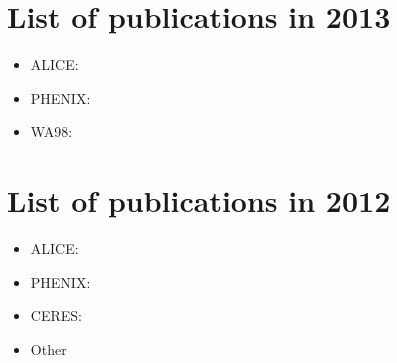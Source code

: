 \documentclass[12pt]{article}
\begin{document}
\section{List of publications in 2013}

\begin{itemize}
\item ALICE:
\cite{
Abelev:2012sq,
ALICE:2012xs,
Abelev:2012sea,
Abelev:2012sca,
Abelev:2012pv,
Abelev:2012pa,
Abelev:2012di,
Abelev:2013xaa,
ABELEV:2013wsa,
Abelev:2013sqa,
Abelev:2013bla,
Abelev:2013ala,
Abelev:2013cva,
Abbas:2013taa,
Abelev:2013lca,
Abbas:2013rua,
Abbas:2013oua,
Abbas:2013bpa,
ALICE:2013xna,
Abelev:2013vea,
Abelev:2013qoq,
Abelev:2013csa,
Abelev:2013fn,
Abelev:2012ola,
ALICE:2012mj,
Abelev:2012ba,
Abelev:2012hxa}

\item PHENIX:
\cite{
Adare:2012bv,
Adare:2012vv,
Adare:2013wop,
Adare:2013ezl,
Adare:2013esx,
Adare:2013piz,
Adare:2012qi,
Adare:2012vw,
Adare:2012wg,
Adare:2012qf}


\item WA98:
\cite{Aggarwal:2011ns}

\end{itemize}

\section{List of publications in 2012}

\begin{itemize}
\item ALICE:
\cite{
Abelev:2012ej,
ALICE:2011ac,
ALICE:2011aa,
Abelev:2011md,
Aamodt:2011vg,
Abelev:2012hy,
Abelev:2012wca,
Abelev:2012tca,
Abelev:2012ms,
Abelev:2012qh,
Abelev:2012gx,
Abelev:2012cn,
Abelev:2012xe,
Abelev:2012vra,
Abelev:2012sk,
Abelev:2012jp,
Abelev:2012kr,
ALICE:2012aa,
ALICE:2012ab,
Abelev:2012rz,
Abelev:2012rv,
Abelev:2012pi,
ALICE:2011ad,
Aamodt:2011by}
%

\item PHENIX:
\cite{
Adare:2012wf,
Afanasiev:2012dg,
Adare:2012yt,
Adare:2012uk,
Adare:2012px,
Adare:2012vq,
Adare:2012nq,
Adare:2011zr,
Adare:2011vq}


\item CERES:
\cite{Adamova:2012md}

\item Other
\cite{Kral:2012ae}

\end{itemize}
\end{document}
